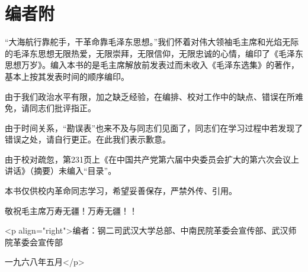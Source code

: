 \section[编者附]{编者附}


“大海航行靠舵手，干革命靠毛泽东思想。”我们怀着对伟大领袖毛主席和光焰无际的毛泽东思想无限热爱，无限崇拜，无限信仰，无限忠诚的心情，编印了《毛泽东思想万岁》。编入本书的是毛主席解放前发表过而未收入《毛泽东选集》的著作，基本上按其发表时间的顺序编印。

由于我们政治水平有限，加之缺乏经验，在编排、校对工作中的缺点、错误在所难免，请同志们批评指正。

由于时间关系，“勘误表”也来不及与同志们见面了，同志们在学习过程中若发现了错误之处，请自行更正。在此我们表示歉意。

由于校对疏忽，第231页上《在中国共产党第六届中央委员会扩大的第六次会议上讲话》（摘要）未编入“目录”。

本书仅供校内革命同志学习，希望妥善保存，严禁外传、引用。

敬祝毛主席万寿无疆！万寿无疆！！

<p align="right">编者：钢二司武汉大学总部、中南民院革委会宣传部、武汉师院革委会宣传部

一九六八年五月</p>

